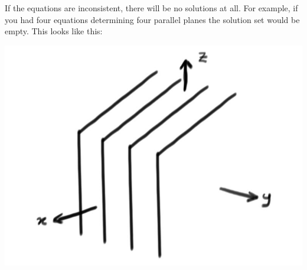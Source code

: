 {\begin{itemize}
If the equations are inconsistent, there will be no solutions at all. For example, if you had four equations determining four parallel planes the solution set would be empty. This looks like this:
\begin{center}
\includegraphics[alt={Four parallel planes in space.},scale=.16]{four_planes_in_R3.jpg}
\end{center}
\end{itemize}



}

